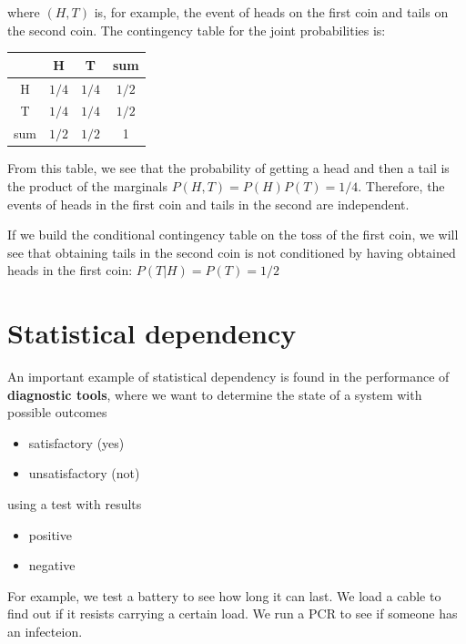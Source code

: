 \documentclass[
]{book}
\providecommand{\tightlist}{%
  \setlength{\itemsep}{0pt}\setlength{\parskip}{0pt}}
\begin{document}
where \(( H,T )\) is, for example, the event of heads on the first coin and tails on the second coin. The contingency table for the joint probabilities is:

\begin{longtable}[]{@{}cccc@{}}
\toprule\noalign{}
& H & T & sum \\
\midrule\noalign{}
\endhead
\bottomrule\noalign{}
\endlastfoot
H & \(1/4\) & \(1/4\) & \(1/2\) \\
T & \(1/4\) & \(1/4\) & \(1/2\) \\
sum & \(1/2\) & \(1/2\) & 1 \\
\end{longtable}

From this table, we see that the probability of getting a head and then a tail is the product of the marginals \(P( H, T)=P(H)P(T)=1/4\). Therefore, the events of heads in the first coin and tails in the second are independent.

If we build the conditional contingency table on the toss of the first coin, we will see that obtaining tails in the second coin is not conditioned by having obtained heads in the first coin: \(P(T| H)= P(T) =1 / 2\)

\hypertarget{statistical-dependency}{%
\section{Statistical dependency}\label{statistical-dependency}}

An important example of statistical dependency is found in the performance of \textbf{diagnostic tools}, where we want to determine the state of a system with possible outcomes

\begin{itemize}
\tightlist
\item
  satisfactory (yes)
\item
  unsatisfactory (not)
\end{itemize}

using a test with results

\begin{itemize}
\tightlist
\item
  positive
\item
  negative
\end{itemize}

For example, we test a battery to see how long it can last. We load a cable to find out if it resists carrying a certain load. We run a PCR to see if someone has an infecteion.
\end{document}
